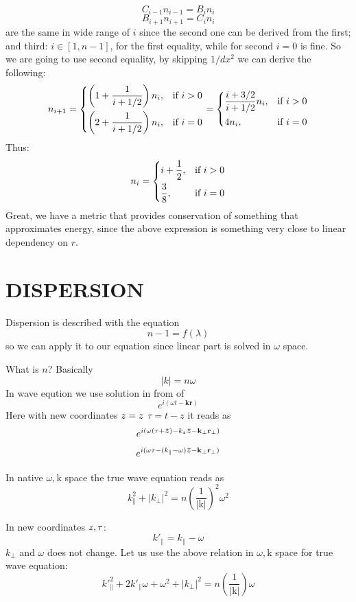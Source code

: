 \documentclass{article}
\newcommand{\ff}{\frac}
\newcommand{\mathz}{\ooalign{$z$\cr\hfil\rule[.5ex]{.2em}{.06ex}\hfil\cr}}
\begin{document}
\[ C_{i-1} n_{i-1} = B_{i} n_i \]
\[ B_{i+1} n_{i+1} = C_{i} n_i \]
are the same in wide range of $i$ since the second one can be derived from the first; and third: $i\in[1,n-1]$, for the first equality, while for second $i=0$ is fine.
So we are going to use second equality, by skipping $1/dx^2$ we can derive the following:
\[ n_{i+1} = \begin{dcases}
              \left(1+\ff{1}{i+1/2}\right) n_i,& \text{if } i>0 \\
              \left(2+\ff{1}{i+1/2}\right) n_i,& \text{if } i=0
             \end{dcases}
           = \begin{dcases}
              \ff{i+3/2}{i+1/2} n_i,& \text{if } i>0 \\
              4 n_i,& \text{if } i=0
             \end{dcases}
\]
Thus:
\[ n_i = \begin{dcases}
              i+\ff{1}{2},& \text{if } i>0 \\
              \ff{3}{8},& \text{if } i=0
          \end{dcases}
\]
Great, we have a metric that provides conservation of something that approximates energy, since the above expression is something very close to linear dependency on $r$.
\section{DISPERSION}
Dispersion is described with the equation
\[ n-1 = f(\lambda) \]
so we can apply it to our equation since linear part is solved in $\omega$ space.

What is $n$? Basically
\[ |k| = n \omega \]
In wave eqution we use solution in from of
\[ e^{i(\omega t - \mathbf{k} \mathbf{r})} \]
Here with new coordinates $\mathz = z$ $\tau = t - z$ it reads as
\[ e^{i(\omega (\tau+\mathz) - k_z \mathz- \mathbf{k}_\perp \mathbf{r}_\perp)} \]
\[ e^{i(\omega \tau - (k_\parallel-\omega) \mathz- \mathbf{k}_\perp \mathbf{r}_\perp)} \]

In native $\omega, \mathrm{k}$ space the true wave equation reads as
\[ k^2_\parallel + |k_\perp|^2 = n\left(\ff{1}{|\mathrm{k}|}\right)^2 \omega^2 \]

In new coordinates $\mathz, \tau$:
\[ k'_\parallel = k_\parallel - \omega \]
$k_\perp$ and $\omega$ does not change.
Let us use the above relation in  $\omega, \mathrm{k}$ space for true wave equation:
\[ k'^2_\parallel + 2 k'_\parallel \omega + \omega^2 + |k_\perp|^2 = n\left(\ff{1}{|\mathrm{k}|}\right) \omega \]
\end{document}
